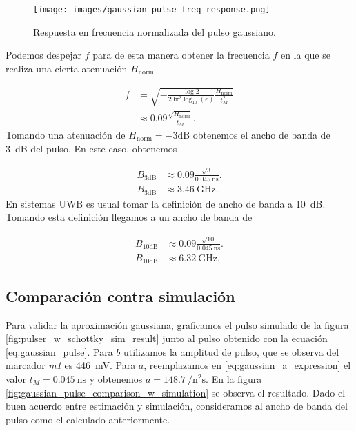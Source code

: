 \begin{figure}[t!]
    \centering
    \texttt{[image: images/gaussian\_pulse\_freq\_response.png]}
    \caption{Respuesta en frecuencia normalizada del pulso gaussiano.}
    \label{fig:gaussian_pulse_freq_response}
\end{figure}

Podemos despejar $f$ para de esta manera obtener la frecuencia $f$ en la que se
realiza una cierta atenuación $H_{\text{norm}}$

\begin{align}
    f &= \sqrt{-\frac{\log 2 }{20 \pi^2 \log_{10}(e)} \frac{H_{\text{norm}}}{t_M^2}} \\
    &\approx 0.09 \frac{\sqrt{H_{\text{norm}}}}{t_M}.
\end{align}
Tomando una atenuación de $H_{\text{norm}}=-3$dB obtenemos el ancho de banda de
\qty{3}{\dB} del pulso. En este caso, obtenemos

\begin{equation}
    \begin{aligned}
        B_{\text{3dB}} &\approx 0.09 \frac{\sqrt{3}}{\qty{0.045}{\nano\second}}.  \\
        B_{\text{3dB}} &\approx \qty{3.46}{\giga\hertz}.
    \end{aligned}
\end{equation}
En sistemas UWB es usual tomar la definición de ancho de banda a \qty{10}{\dB}.
Tomando esta definición llegamos a un ancho de banda de

\begin{equation}
    \begin{aligned}
        B_{\text{10dB}} &\approx 0.09 \frac{\sqrt{10}}{\qty{0.045}{\nano\second}}.  \\
        B_{\text{10dB}} &\approx \qty{6.32}{\giga\hertz}.
    \end{aligned}
\end{equation}

\subsection{Comparación contra simulación}

Para validar la aproximación gaussiana, graficamos el pulso simulado de la
figura \ref{fig:pulser_w_schottky_sim_result} junto al pulso obtenido con la
ecuación \ref{eq:gaussian_pulse}. Para $b$ utilizamos la amplitud de pulso, que
se observa del marcador \textit{m1} es \qty{446}{\milli\volt}. Para $a$,
reemplazamos en \ref{eq:gaussian_a_expression} el valor
$t_M=\qty{0.045}{\nano\second}$ y obtenemos $a=
\qty{148.7}{\per\square\nano\second}$. En la figura
\ref{fig:gaussian_pulse_comparison_w_simulation} se observa el resultado. Dado
el buen acuerdo entre estimación y simulación, consideramos al ancho de banda
del pulso como el calculado anteriormente.

